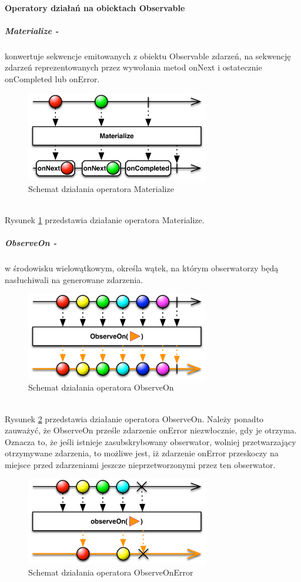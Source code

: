 \documentclass[12pt,oneside,a4paper]{report}
\begin{document}
\paragraph{Operatory działań na obiektach Observable}
\subparagraph{Materialize -}konwertuje sekwencje emitowanych z obiektu Observable zdarzeń, na sekwencję zdarzeń reprezentowanych przez wywołania metod onNext i ostatecznie onCompleted lub onError.
\begin{figure}[ht!]
	\centering
	\includegraphics[width=8cm]{materialize}
	\caption{Schemat działania operatora Materialize\cite{operators}}
	\label{materialize}
\end{figure}\\
Rysunek \ref{materialize} przedstawia działanie operatora Materialize.
\subparagraph{ObserveOn -}w środowisku wielowątkowym, określa wątek, na którym obserwatorzy będą nasłuchiwali na generowane zdarzenia. 
\begin{figure}[ht!]
	\centering
	\includegraphics[width=8cm]{observeOn}
	\caption{Schemat działania operatora ObserveOn\cite{operators}}
	\label{observeOn}
\end{figure}\\
Rysunek \ref{observeOn} przedstawia działanie operatora ObserveOn.
Należy ponadto zauważyć, że ObserveOn prześle zdarzenie onError niezwłocznie, gdy je otrzyma. Oznacza to, że jeśli istnieje zasubskrybowany obserwator, wolniej przetwarzający otrzymywane zdarzenia, to możliwe jest, iż zdarzenie onError przeskoczy na miejsce przed zdarzeniami jeszcze nieprzetworzonymi przez ten obserwator. 
\begin{figure}[ht!]
	\centering
	\includegraphics[width=8cm]{observeOnError}
	\caption{Schemat działania operatora ObserveOnError\cite{operators}}
	\label{observeOnError}
\end{figure}\\
\end{document}
